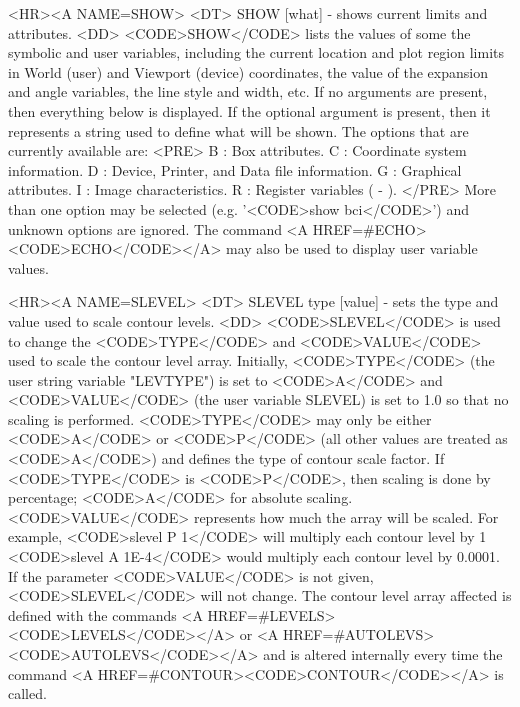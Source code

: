 \begin{rawhtml}
<HR><A NAME=SHOW>
<DT>
SHOW [what] - shows current limits and attributes.
<DD>
	<CODE>SHOW</CODE> lists the values of some the symbolic and user
	variables, including the current location and plot region limits
	in World (user) and Viewport (device) coordinates, the value of
	the expansion and angle variables, the line style and width, etc.
	If no arguments are present, then everything below is displayed.
	If the optional argument is present, then it represents a string
	used to define what will be shown.  The options that are currently
	available are:
	<PRE>
    B : Box attributes.
    C : Coordinate system information.
    D : Device, Printer, and Data file information.
    G : Graphical attributes.
    I : Image characteristics.
    R : Register variables (\0 - ).
	</PRE>
	More than one option may be selected (e.g. '<CODE>show bci</CODE>')
	and unknown options are ignored.  The command
	<A HREF=#ECHO><CODE>ECHO</CODE></A> may also be used to display
	user variable values.

<HR><A NAME=SLEVEL>
<DT>
SLEVEL type [value] - sets the type and value used to scale contour levels.
<DD>
	<CODE>SLEVEL</CODE> is used to change the <CODE>TYPE</CODE> and
	<CODE>VALUE</CODE> used to scale the contour level array.
	Initially, <CODE>TYPE</CODE> (the user string variable "LEVTYPE")
	is set to <CODE>A</CODE> and <CODE>VALUE</CODE> (the user variable
	SLEVEL) is set to 1.0 so that no scaling is performed.
	<CODE>TYPE</CODE> may only be either <CODE>A</CODE> or <CODE>P</CODE>
	(all other values are treated as <CODE>A</CODE>) and defines the
	type of contour scale factor.  If <CODE>TYPE</CODE> is <CODE>P</CODE>,
	then scaling is done by percentage; <CODE>A</CODE> for absolute
	scaling.  <CODE>VALUE</CODE> represents how much the array will
	be scaled.  For example, <CODE>slevel P 1</CODE> will multiply
	each contour level by 1%
	<CODE>slevel A 1E-4</CODE> would multiply each contour level
	by 0.0001.  If the parameter <CODE>VALUE</CODE> is not given,
	<CODE>SLEVEL</CODE> will not change.  The contour level array
	affected is defined with the commands
	<A HREF=#LEVELS><CODE>LEVELS</CODE></A> or
	<A HREF=#AUTOLEVS><CODE>AUTOLEVS</CODE></A>
	and is altered internally every time the command
	<A HREF=#CONTOUR><CODE>CONTOUR</CODE></A> is called.


\end{rawhtml}
